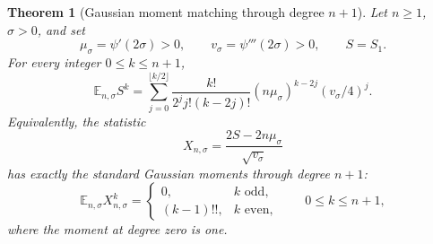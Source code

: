 \documentclass[11pt,a4paper]{article}
\numberwithin{equation}{section}
\newtheorem{theorem}{Theorem}[section]
\theoremstyle{definition}
\theoremstyle{remark}
\begin{document}
\begin{theorem}[Gaussian moment matching through degree $n+1$]
\label{gn:thm:gaussian}
Let $n\ge1$, $\sigma>0$, and set
\begin{equation}\label{gn:eq:mu-v}
 \mu_\sigma=\psi'(2\sigma)>0,\qquad
 v_\sigma=\psi'''(2\sigma)>0,
 \qquad S=S_1.
\end{equation}
For every integer $0\le k\le n+1$,
\begin{equation}\label{gn:eq:S-moments}
 \boxed{\displaystyle
 \mathbb E_{n,\sigma}S^k
 =\sum_{j=0}^{\lfloor k/2\rfloor}
       \frac{k!}{2^jj!(k-2j)!}
       (n\mu_\sigma)^{k-2j}(v_\sigma/4)^j.}
\end{equation}
Equivalently, the statistic
\begin{equation}\label{gn:eq:X}
             X_{n,\sigma}
       =\frac{2S-2n\mu_\sigma}{\sqrt{v_\sigma}}
\end{equation}
has exactly the standard Gaussian moments through degree $n+1$:
\begin{equation}\label{gn:eq:Gaussian-moments}
 \mathbb E_{n,\sigma}X_{n,\sigma}^{k}
 =\begin{cases}
    0,&k\text{ odd},\\[2pt]
    (k-1)!!,&k\text{ even},
   \end{cases}
 \qquad 0\le k\le n+1,
\end{equation}
where the moment at degree zero is one.
\end{theorem}
\end{document}
